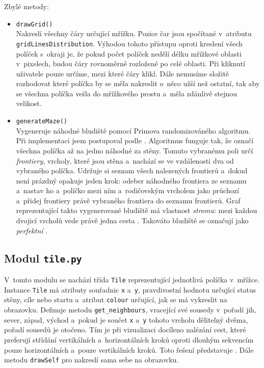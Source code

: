 \documentclass[12pt]{report}			%
\begin{document}
Zbylé metody:
\begin{itemize}
			\setlength\itemsep{0.01mm}
\item \texttt{drawGrid()}\\
Nakreslí všechny čáry určující mřížku. Pozice čar jsou spočítané v~atributu \\ \texttt{gridLinesDistribution}. Výhodou tohoto přístupu oproti kreslení všech políček s~okraji je, že pokud počet políček nedělí délku mřížkové oblasti v~pixelech, budou čáry rovnoměrně rozložené po celé oblasti. Při kliknutí uživatele pouze určíme, mezi které čáry klikl. Dále nemusíme složitě rozhodovat které políčka by se měla nakreslit o~něco užší než ostatní, tak aby se všechna políčka vešla do mřížkového prostu a~měla zdánlivě stejnou velikost.
\item \texttt{generateMaze()}\\
Vygeneruje náhodné bludiště pomocí Primova randomizováného algoritmu. Při implementaci jsem postupoval podle \cite{prim}.
Algoritmus funguje tak, že označí všechna políčka až na jedno náhodné za stěny. Tomuto vybranému poli určí \emph{frontiery}, vrcholy, které jsou stěna a~nachází se ve vzdálenosti dva od vybraného políčka. Udržuje si seznam všech nalezených frontierů a~dokud není prázdný opakuje jeden krok: odeber náhodného frontiera ze seznamu a~nastav ho a~políčko mezi ním a~rodičovským vrcholem jako průchozí a~přidej frontiery právě vybraného frontiera do seznamu frontierů. Graf reprezentující takto vygenerované bludiště má vlastnost \emph{stromu}: mezi každou dvojicí vrcholů vede právě jedna cesta \cite{pruvodce}. Takováto bludiště se označují jako \emph{perfektní} \cite{maze}.
		
\end{itemize}
			
			
			\subsection{Modul \texttt{tile.py}}
			V~tomto modulu se nachází třída \texttt{Tile} reprezentující jednotlivá políčka v~mřížce. Instance \texttt{Tile} má atributy souřadnic \texttt{x} a~\texttt{y}, pravdivostní hodnotu určující status stěny, cíle nebo startu a~atribut \texttt{colour} určující, jak se má vykreslit na obrazovku. Definuje metodu \texttt{get\_neighbours}, vracející své sousedy v~pořadí jih, sever, západ, východ a~pokud je součet \texttt{x} a~\texttt{y} tohoto vrcholu dělitelný dvěma, pořadí sousedů je otočeno. Tím je při vizualizaci docíleno nalézání  cest, které preferují střídání vertikálních a~horizontálních kroků oproti dlouhým sekvencím pouze horizontálních a~pouze vertikálních kroků. Toto řešení představuje \cite{patel_implementation}. Dále metodu \texttt{drawSelf} pro nakreslí sama sebe na obrazovku.
			
\end{document}
